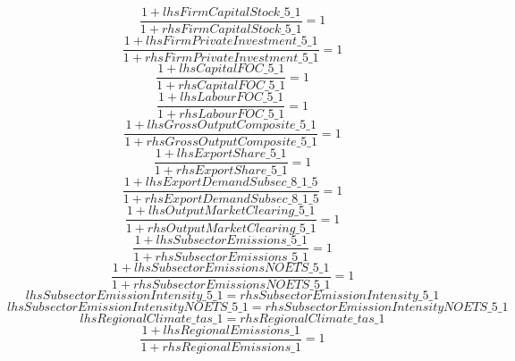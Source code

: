 \begin{dmath}
\frac{1+{lhsFirmCapitalStock\_5\_1}}{1+{rhsFirmCapitalStock\_5\_1}}=1
\end{dmath}
\begin{dmath}
\frac{1+{lhsFirmPrivateInvestment\_5\_1}}{1+{rhsFirmPrivateInvestment\_5\_1}}=1
\end{dmath}
\begin{dmath}
\frac{1+{lhsCapitalFOC\_5\_1}}{1+{rhsCapitalFOC\_5\_1}}=1
\end{dmath}
\begin{dmath}
\frac{1+{lhsLabourFOC\_5\_1}}{1+{rhsLabourFOC\_5\_1}}=1
\end{dmath}
\begin{dmath}
\frac{1+{lhsGrossOutputComposite\_5\_1}}{1+{rhsGrossOutputComposite\_5\_1}}=1
\end{dmath}
\begin{dmath}
\frac{1+{lhsExportShare\_5\_1}}{1+{rhsExportShare\_5\_1}}=1
\end{dmath}
\begin{dmath}
\frac{1+{lhsExportDemandSubsec\_8\_1\_5}}{1+{rhsExportDemandSubsec\_8\_1\_5}}=1
\end{dmath}
\begin{dmath}
\frac{1+{lhsOutputMarketClearing\_5\_1}}{1+{rhsOutputMarketClearing\_5\_1}}=1
\end{dmath}
\begin{dmath}
\frac{1+{lhsSubsectorEmissions\_5\_1}}{1+{rhsSubsectorEmissions\_5\_1}}=1
\end{dmath}
\begin{dmath}
\frac{1+{lhsSubsectorEmissionsNOETS\_5\_1}}{1+{rhsSubsectorEmissionsNOETS\_5\_1}}=1
\end{dmath}
\begin{dmath}
{lhsSubsectorEmissionIntensity\_5\_1}={rhsSubsectorEmissionIntensity\_5\_1}
\end{dmath}
\begin{dmath}
{lhsSubsectorEmissionIntensityNOETS\_5\_1}={rhsSubsectorEmissionIntensityNOETS\_5\_1}
\end{dmath}
\begin{dmath}
{lhsRegionalClimate\_tas\_1}={rhsRegionalClimate\_tas\_1}
\end{dmath}
\begin{dmath}
\frac{1+{lhsRegionalEmissions\_1}}{1+{rhsRegionalEmissions\_1}}=1
\end{dmath}
